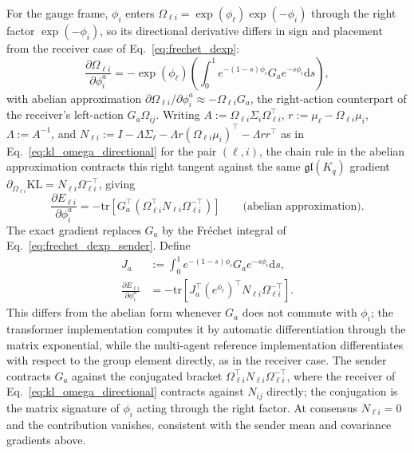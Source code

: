 \documentclass[11pt]{article}
\begin{document}
For the gauge frame, $\phi_i$ enters $\Omega_{\ell i} = \exp(\phi_\ell)\exp(-\phi_i)$ through the right factor $\exp(-\phi_i)$, so its directional derivative differs in sign and placement from the receiver case of Eq.~\eqref{eq:frechet_dexp}:
\begin{equation}
\frac{\partial \Omega_{\ell i}}{\partial \phi_i^a} = -\exp(\phi_\ell)\left(\int_0^1 e^{-(1-s)\phi_i} G_a e^{-s\phi_i} \mathrm{d}s\right),
\label{eq:frechet_dexp_sender}
\end{equation}
with abelian approximation $\partial \Omega_{\ell i}/\partial \phi_i^a \approx -\Omega_{\ell i} G_a$, the right-action counterpart of the receiver's left-action $G_a\Omega_{ij}$. Writing $A := \Omega_{\ell i}\Sigma_i\Omega_{\ell i}^\top$, $r := \mu_\ell - \Omega_{\ell i}\mu_i$, $\Lambda := A^{-1}$, and $N_{\ell i} := I - \Lambda\Sigma_\ell - \Lambda r(\Omega_{\ell i}\mu_i)^\top - \Lambda r r^\top$ as in Eq.~\eqref{eq:kl_omega_directional} for the pair $(\ell, i)$, the chain rule in the abelian approximation contracts this right tangent against the same $\mathfrak{gl}(K_q)$ gradient $\partial_{\Omega_{\ell i}}\mathrm{KL} = N_{\ell i}\Omega_{\ell i}^{-\top}$, giving
\begin{equation}
\frac{\partial E_{\ell i}}{\partial \phi_i^a} = -\mathrm{tr}\left[G_a^\top\left(\Omega_{\ell i}^\top N_{\ell i} \Omega_{\ell i}^{-\top}\right)\right] \qquad \text{(abelian approximation)}.
\label{eq:sender_phi_gradient}
\end{equation}
The exact gradient replaces $G_a$ by the Fr\'echet integral of Eq.~\eqref{eq:frechet_dexp_sender}. Define
\begin{equation}
\begin{aligned}
J_a
&:= \int_0^1 e^{-(1-s)\phi_i} G_a e^{-s\phi_i} \mathrm{d}s, \\
\frac{\partial E_{\ell i}}{\partial \phi_i^a}
&= -\mathrm{tr}\left[J_a^\top (e^{\phi_\ell})^\top
N_{\ell i}\Omega_{\ell i}^{-\top}\right].
\end{aligned}
\end{equation}
This differs from the abelian form whenever $G_a$ does not commute with $\phi_i$; the transformer implementation computes it by automatic differentiation through the matrix exponential, while the multi-agent reference implementation differentiates with respect to the group element directly, as in the receiver case. The sender contracts $G_a$ against the conjugated bracket $\Omega_{\ell i}^\top N_{\ell i}\Omega_{\ell i}^{-\top}$, where the receiver of Eq.~\eqref{eq:kl_omega_directional} contracts against $N_{ij}$ directly; the conjugation is the matrix signature of $\phi_i$ acting through the right factor. At consensus $N_{\ell i} = 0$ and the contribution vanishes, consistent with the sender mean and covariance gradients above.
\end{document}
